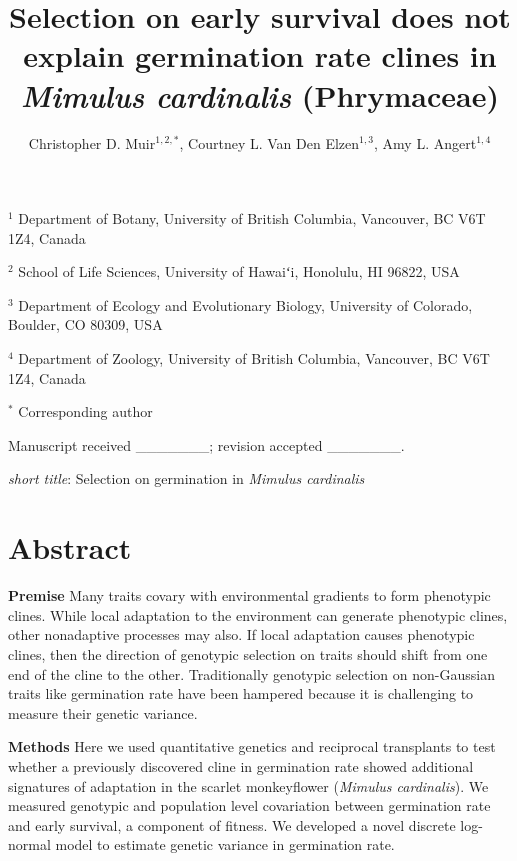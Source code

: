\documentclass[
  12pt,
]{article}
\title{Selection on early survival does not explain germination rate clines in \emph{Mimulus cardinalis} (Phrymaceae)}
\author{Christopher D. Muir\(^{1,2,*}\), Courtney L. Van Den Elzen\(^{1,3}\), Amy L. Angert\(^{1,4}\)}
\date{}
\makeatletter
\newcommand\iraggedright{%
  \let\\\@centercr\@rightskip\@flushglue \rightskip\@rightskip
  \leftskip\z@skip}
\makeatother
\begin{document}
\maketitle

\iraggedright

\newcommand{\pkg}[1]{{\fontseries{b}\selectfont #1}} 

\(^{1}\) Department of Botany, University of British Columbia, Vancouver, BC V6T 1Z4, Canada

\(^{2}\) School of Life Sciences, University of Hawaiʻi, Honolulu, HI 96822, USA

\(^{3}\) Department of Ecology and Evolutionary Biology, University of Colorado, Boulder, CO 80309, USA

\(^{4}\) Department of Zoology, University of British Columbia, Vancouver, BC V6T 1Z4, Canada

\(^{*}\) Corresponding author

Manuscript received \_\_\_\_\_\_\_; revision accepted \_\_\_\_\_\_\_.

\emph{short title}: Selection on germination in \emph{Mimulus cardinalis}

\hypertarget{abstract}{%
\section{Abstract}\label{abstract}}

\textbf{Premise} Many traits covary with environmental gradients to form phenotypic clines. While local adaptation to the environment can generate phenotypic clines, other nonadaptive processes may also. If local adaptation causes phenotypic clines, then the direction of genotypic selection on traits should shift from one end of the cline to the other. Traditionally genotypic selection on non-Gaussian traits like germination rate have been hampered because it is challenging to measure their genetic variance.

\textbf{Methods} Here we used quantitative genetics and reciprocal transplants to test whether a previously discovered cline in germination rate showed additional signatures of adaptation in the scarlet monkeyflower (\emph{Mimulus cardinalis}). We measured genotypic and population level covariation between germination rate and early survival, a component of fitness. We developed a novel discrete log-normal model to estimate genetic variance in germination rate.
\end{document}
